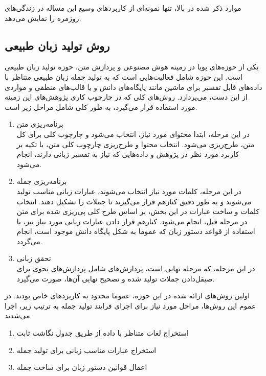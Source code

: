 موارد ذکر شده در بالا، تنها نمونه‌ای از کاربردهای وسیع این مساله در زندگی‌های روزمره را نمایش می‌دهد.



\subsection{روش‌ تولید زبان طبیعی}

یکی از حوزه‌های پویا در زمینه هوش مصنوعی و پردازش متن، حوزه تولید زبان طبیعی است. این حوزه شامل فعالیت‌هایی است که به تولید جمله زبان طبیعی متناظر با داده‌های قابل تفسیر برای ماشین مانند پایگاه‌های دانش 
و یا قالب‌های منطقی
و مواردی از این دست، می‌‌پردازد. روش‌های کلی که در چارچوب کاری  پژوهش‌های این زمینه مورد استفاده قرار می‌گیرد، به ‌طور کلی شامل مراحل زیر است\cite{reiter1997building}.

\begin{enumerate}
\item برنامه‌ریزی متن
\\
در این مرحله، ابتدا محتوای مورد نیاز، انتخاب می‌‌شود و چارچوب کلی برای کل متن، طرح‌ریزی می‌شود. انتخاب محتوا و طرح‌ریزی چارچوب کلی متن، با تکیه بر کاربرد مورد نظر در پژوهش و داده‌هایی که نیاز به تفسیر زبانی دارند، انجام می‌شود.
\item برنامه‌ریزی جمله
\\
در این مرحله، کلمات مورد نیاز انتخاب می‌شوند، عبارات زبانی مناسب تولید می‌شوند و به طور دقیق کنارهم قرار می‌گیرند تا جملات را تشکیل دهند. انتخاب کلمات و ساخت عبارات در این بخش، بر اساس طرح کلی پی‌ریزی شده برای متن در مرحله قبل، انجام می‌شود. کنارهم قرار دادن عبارات زبانی مورد نیاز نیز، با استفاده از قواعد دستور زبان که عموما به شکل پایگاه دانش موجود است، انجام می‌گردد.
\item تحقق زبانی
\\
در این مرحله، که مرحله نهایی است، پردازش‌های شامل پردازش‌های نحوی برای صیقل‌دادن جملات تولید شده و تصحیح نهایی آن‌ها،‌ صورت می‌گیرد.
\end{enumerate}


اولین روش‌های ارائه شده در این حوزه، عموما محدود به کاربردهای خاص بودند. در عموم این روش‌ها، مراحل مورد نیاز برای اجرای فرایند تولید جمله به ترتیب زیر، اجرا می‌شدند.
\\
\begin{enumerate}
\item استخراج لغات متناظر با داده از طریق جدول نگاشت ثابت
\item استخراج عبارات مناسب زبانی برای تولید جمله
\item اعمال قوانین دستور زبان برای ساخت جمله
\end{enumerate}

